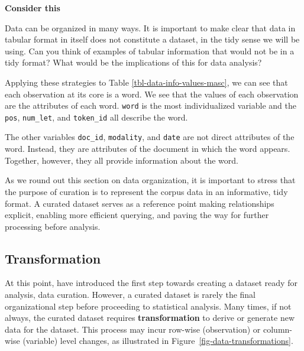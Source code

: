 \documentclass[
  letterpaper,
  krantz1]{latex/krantz-mod}
\theoremstyle{definition}
\theoremstyle{definition}
\theoremstyle{remark}
\begin{document}
\begin{tcolorbox}[enhanced jigsaw, toprule=.15mm, breakable, colback=white, arc=.35mm, left=2mm, colframe=quarto-callout-color-frame, opacityback=0, bottomrule=.15mm, rightrule=.15mm, leftrule=.75mm]

\textbf{ Consider this}

Data can be organized in many ways. It is important to make clear that
data in tabular format in itself does not constitute a dataset, in the
tidy sense we will be using. Can you think of examples of tabular
information that would not be in a tidy format? What would be the
implications of this for data analysis?

\end{tcolorbox}

Applying these strategies to Table \ref{tbl-data-info-values-masc}, we
can see that each observation at its core is a word. We see that the
values of each observation are the attributes of each word.
\texttt{word} is the most individualized variable and the \texttt{pos},
\texttt{num\_let}, and \texttt{token\_id} all describe the word.

The other variables \texttt{doc\_id}, \texttt{modality}, and
\texttt{date} are not direct attributes of the word. Instead, they are
attributes of the document in which the word appears. Together, however,
they all provide information about the word.

As we round out this section on data organization, it is important to
stress that the purpose of curation is to represent the
corpus data in an informative, tidy format. A curated
dataset serves as a reference point making relationships explicit,
enabling more efficient querying, and paving the way for further
processing before analysis.

\subsection{Transformation}\label{sec-data-transformation}

At this point, have introduced the first step towards creating a dataset
ready for analysis, data curation. However, a curated dataset is rarely
the final organizational step before proceeding to statistical analysis.
Many times, if not always, the curated dataset requires
\textbf{transformation} to derive or generate new
data for the dataset. This process may incur row-wise (observation) or
column-wise (variable) level changes, as illustrated in
Figure~\ref{fig-data-transformations}.
\end{document}
